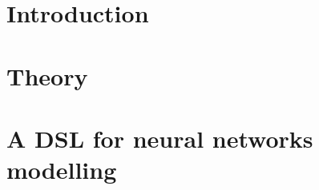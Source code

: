 \documentclass[a4paper,oneside]{memoir}
\begin{document}
\mainmatter

\chapter{Introduction} \label{sec:intro}
  

\chapter{Theory} \label{sec:theory}
  
\chapter{A DSL for neural networks modelling} \label{sec:dsl}
  
  \begin{comment}
\chapter{Experiment} \label{sec:experiment}
%  

\chapter{Analysis} \label{sec:analysis}



\end{comment}
\end{document}
